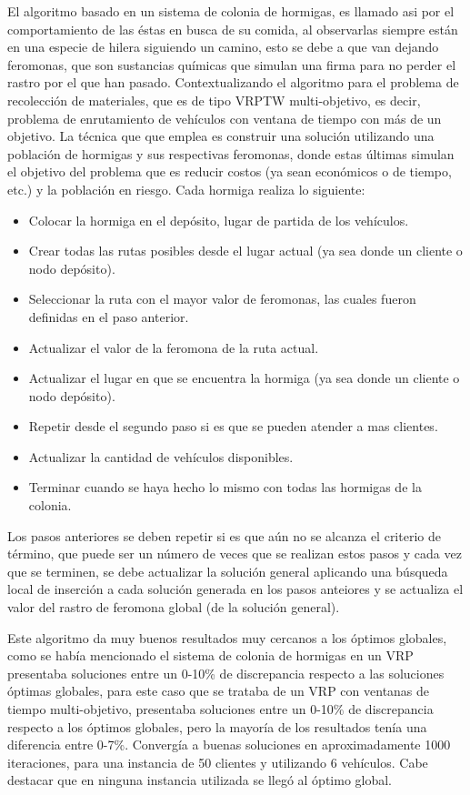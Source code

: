 \documentclass[conference]{IEEEtran}
\begin{document}
El algoritmo basado en un sistema de colonia de hormigas, es llamado asi por el comportamiento de las éstas en busca de su comida, al observarlas siempre están en una especie de hilera siguiendo un camino, esto se debe a que van dejando feromonas, que son sustancias qu\'imicas que simulan una firma para no perder el rastro por el que han pasado. Contextualizando el algoritmo para el problema de recolecci\'on de materiales, que es de tipo VRPTW multi-objetivo, es decir, problema de enrutamiento de veh\'iculos con ventana de tiempo con m\'as de un objetivo. La t\'ecnica que que emplea es construir una soluci\'on utilizando una poblaci\'on de hormigas y sus respectivas feromonas, donde estas \'ultimas simulan el objetivo del problema que es reducir costos (ya sean econ\'omicos o de tiempo, etc.) y la poblaci\'on en riesgo. Cada hormiga realiza lo siguiente:

\begin{itemize}
\item Colocar la hormiga en el dep\'osito, lugar de partida de los veh\'iculos.
\item Crear todas las rutas posibles desde el lugar actual (ya sea donde un cliente o nodo dep\'osito).
\item Seleccionar la ruta con el mayor valor de feromonas, las cuales fueron definidas en el paso anterior.
\item Actualizar el valor de la feromona de la ruta actual.
\item Actualizar el lugar en que se encuentra la hormiga (ya sea donde un cliente o nodo dep\'osito).
\item Repetir desde el segundo paso si es que se pueden atender a mas clientes.
\item Actualizar la cantidad de veh\'iculos disponibles.
\item Terminar cuando se haya hecho lo mismo con todas las hormigas de la colonia.
\end{itemize}

Los pasos anteriores se deben repetir si es que a\'un no se alcanza el criterio de t\'ermino, que puede ser un n\'umero de veces que se realizan estos pasos y cada vez que se terminen, se debe actualizar la soluci\'on general aplicando una b\'usqueda local de inserci\'on a cada soluci\'on generada en los pasos anteiores y se actualiza el valor del rastro de feromona global (de la soluci\'on general). 

Este algoritmo da muy buenos resultados muy cercanos a los \'optimos globales, como se hab\'ia mencionado el sistema de colonia de hormigas en un VRP presentaba soluciones entre un 0-10\% de discrepancia respecto a las soluciones \'optimas globales, para este caso que se trataba de un VRP con ventanas de tiempo multi-objetivo, presentaba soluciones entre un 0-10\% de discrepancia respecto a los \'optimos globales, pero la mayor\'ia de los resultados ten\'ia una diferencia entre 0-7\%. Converg\'ia a buenas soluciones en aproximadamente 1000 iteraciones, para una instancia de 50 clientes y utilizando 6 veh\'iculos. Cabe destacar que en ninguna instancia utilizada se lleg\'o al \'optimo global.
\end{document}
